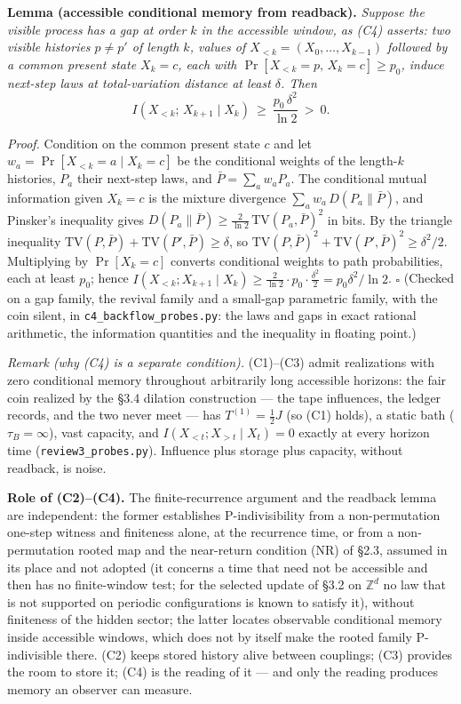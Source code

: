 \documentclass[
]{article}
\begin{document}
\textbf{Lemma (accessible conditional memory from readback).}
\emph{Suppose the visible process has a gap at order \(k\) in the
accessible window, as (C4) asserts: two visible histories \(p \neq p'\)
of length \(k\), values of \(X_{<k} = (X_0, \ldots, X_{k-1})\) followed
by a common present state \(X_k = c\), each with
\(\Pr[X_{<k} = p,\, X_k = c] \geq p_0\), induce next-step laws at
total-variation distance at least \(\delta\). Then}
\[I(X_{<k};\,X_{k+1} \mid X_k)\ \geq\ \frac{p_0\,\delta^2}{\ln 2}\ >\ 0.\]

\emph{Proof.} Condition on the common present state \(c\) and let
\(w_a = \Pr[X_{<k} = a \mid X_k = c]\) be the conditional weights of the
length-\(k\) histories, \(P_a\) their next-step laws, and
\(\bar P = \sum_a w_a P_a\). The conditional mutual information given
\(X_k = c\) is the mixture divergence \(\sum_a w_a\, D(P_a \| \bar P)\),
and Pinsker's inequality gives
\(D(P_a \| \bar P) \geq \tfrac{2}{\ln 2}\,\mathrm{TV}(P_a, \bar P)^2\)
in bits. By the triangle inequality
\(\mathrm{TV}(P, \bar P) + \mathrm{TV}(P', \bar P) \geq \delta\), so
\(\mathrm{TV}(P,\bar P)^2 + \mathrm{TV}(P',\bar P)^2 \geq \delta^2/2\).
Multiplying by \(\Pr[X_k = c]\) converts conditional weights to path
probabilities, each at least \(p_0\); hence
\(I(X_{<k}; X_{k+1} \mid X_k) \geq \tfrac{2}{\ln 2} \cdot p_0 \cdot \tfrac{\delta^2}{2} = p_0\delta^2/\ln 2\).
\(\square\) (Checked on a gap family, the revival family and a small-gap
parametric family, with the coin silent, in
\texttt{c4\_backflow\_probes.py}: the laws and gaps in exact rational
arithmetic, the information quantities and the inequality in floating
point.)

\emph{Remark (why (C4) is a separate condition).} (C1)--(C3) admit
realizations with zero conditional memory throughout arbitrarily long
accessible horizons: the fair coin realized by the §3.4 dilation
construction --- the tape influences, the ledger records, and the two
never meet --- has \(T^{(1)} = \tfrac12 J\) (so (C1) holds), a static
bath (\(\tau_B = \infty\)), vast capacity, and
\(I(X_{<t}; X_{>t} \mid X_t) = 0\) exactly at every horizon time
(\texttt{review3\_probes.py}). Influence plus storage plus capacity,
without readback, is noise.

\textbf{Role of (C2)--(C4).} The finite-recurrence argument and the
readback lemma are independent: the former establishes P-indivisibility
from a non-permutation one-step witness and finiteness alone, at the
recurrence time, or from a non-permutation rooted map and the
near-return condition (NR) of §2.3, assumed in its place and not adopted
(it concerns a time that need not be accessible and then has no
finite-window test; for the selected update of §3.2 on \(\mathbb{Z}^d\)
no law that is not supported on periodic configurations is known to
satisfy it), without finiteness of the hidden sector; the latter locates
observable conditional memory inside accessible windows, which does not
by itself make the rooted family P-indivisible there. (C2) keeps stored
history alive between couplings; (C3) provides the room to store it;
(C4) is the reading of it --- and only the reading produces memory an
observer can measure.
\end{document}
